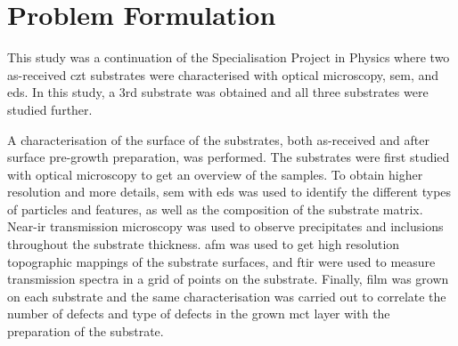 \section{Problem Formulation}%

This study was a continuation of the Specialisation Project in Physics where two as-received \ac{czt} substrates were characterised with optical microscopy, \ac{sem}, and \ac{eds}. In this study, a 3rd substrate was obtained and all three substrates were studied further. 

A characterisation of the surface of the substrates, both as-received and after surface pre-growth preparation, was performed. The substrates were first studied with optical microscopy to get an overview of the samples. To obtain higher resolution and more details, \ac{sem} with \ac{eds} was used to identify the different types of particles and features, as well as the composition of the substrate matrix. Near-\ac{ir} transmission microscopy was used to observe precipitates and inclusions throughout the substrate thickness. \Ac{afm} was used to get high resolution topographic mappings of the substrate surfaces, and \ac{ftir} were used to measure transmission spectra in a grid of points on the substrate. Finally,  film was grown on each substrate and the same characterisation was carried out to correlate the number of defects and type of defects in the grown \ac{mct} layer with the preparation of the substrate.

